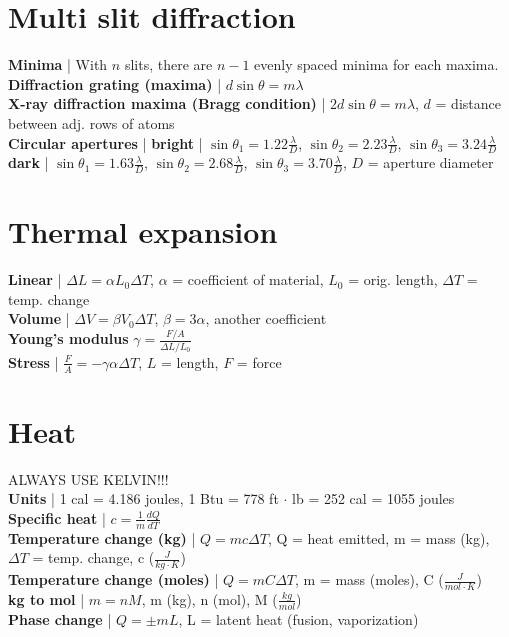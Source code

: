 \documentclass{article}
\begin{document}
\section{Multi slit diffraction}
\vspace{-2mm}
\textbf{Minima} | With $n$ slits, there are $n - 1$ evenly spaced minima for each maxima. \\
\textbf{Diffraction grating (maxima)} | $d\sin\theta = m\lambda$ \\
\textbf{X-ray diffraction maxima (Bragg condition)} | $2d\sin\theta = m\lambda$, $d$ = distance between adj. rows of atoms \\
\textbf{Circular apertures} | \textbf{bright} | $\sin\theta_1 = 1.22\frac{\lambda}{D}$, $\sin\theta_2 = 2.23\frac{\lambda}{D}$, $\sin\theta_3 = 3.24\frac{\lambda}{D}$ \\
\textbf{dark} | $\sin\theta_1 = 1.63\frac{\lambda}{D}$, $\sin\theta_2 = 2.68\frac{\lambda}{D}$, $\sin\theta_3 = 3.70\frac{\lambda}{D}$, $D$ = aperture diameter
\vspace{-5mm}
\section{Thermal expansion}
\vspace{-2mm}
\textbf{Linear} | $\Delta L = \alpha L_0 \Delta T$, $\alpha$ = coefficient of material, $L_0$ = orig. length, $\Delta T$ = temp. change \\
\textbf{Volume} | $\Delta V = \beta V_0 \Delta T$, $\beta = 3\alpha$, another coefficient \\
\textbf{Young's modulus} $\gamma = \frac{F/A}{\Delta L / L_0}$ \\
\textbf{Stress} | $\frac{F}{A} = -\gamma \alpha \Delta T$, $L$ = length, $F$ = force 
\vspace{-5mm}
\section{Heat}
\vspace{-2mm}
ALWAYS USE KELVIN!!! \\
\textbf{Units} | 1 cal = 4.186 joules, 1 Btu = 778 ft $\cdot$ lb = 252 cal = 1055 joules \\
\textbf{Specific heat} | $c = \frac{1}{m}\frac{dQ}{dT}$ \\
\textbf{Temperature change (kg)} | $Q = mc \Delta T$, Q = heat emitted, m = mass (kg), $\Delta T$ = temp. change, c ($\frac{J}{kg \cdot K}$) \\
\textbf{Temperature change (moles)} | $Q = mC \Delta T$, m = mass (moles), C ($\frac{J}{mol \cdot K}$) \\
\textbf{kg to mol} | $m = nM$, m (kg), n (mol), M ($\frac{kg}{mol}$) \\
\textbf{Phase change} | $Q = \pm mL$, L = latent heat (fusion, vaporization) \\
\vspace{-5mm}
\end{document}
